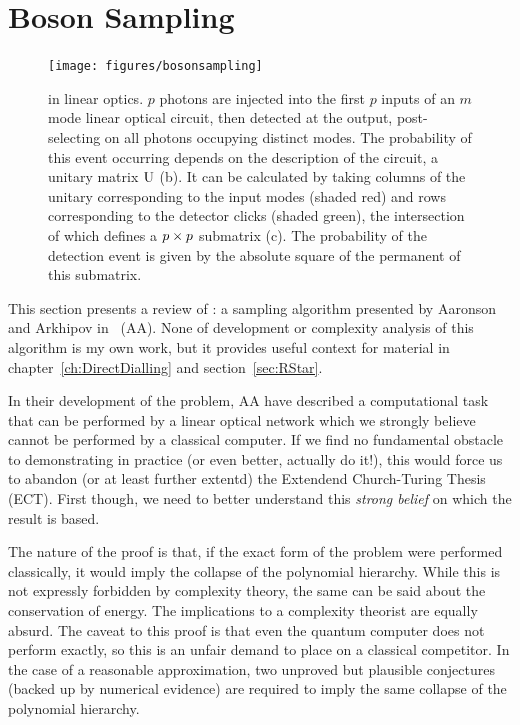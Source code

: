 \section{Boson Sampling}
\label{sec:BosonSampling}
\begin{figure}
  \texttt{[image: figures/bosonsampling]}
  \caption[BosonSampling in linear optics]
  {\bosonsampling{} in linear optics. \(p\) photons are injected into the first
  \(p\) inputs of an \(m\) mode linear optical circuit, then detected at the
  output, post-selecting on all photons occupying distinct modes. The
  probability of this event occurring depends on the description of the circuit,
  a unitary matrix \(\mathrm{U}\) (b). It can be calculated by taking columns of
  the unitary corresponding to the input modes (shaded red) and rows
  corresponding to the detector clicks (shaded green), the intersection of which
  defines a \(p \times p\) submatrix (c). The probability of the detection event is
  given by the absolute square of the permanent of this submatrix.}
  \label{fig:BosonSampling}
\end{figure}
This section presents a review of \bosonsampling{}: a sampling algorithm
presented by Aaronson and Arkhipov in~\cite{bosonsampling} (AA). None of
development or complexity analysis of this algorithm is my own work, but it
provides useful context for material in chapter~\ref{ch:DirectDialling} and
section~\ref{sec:RStar}.

In their development of the \bosonsampling{} problem, AA have described a
computational task that can be performed by a linear optical network which we
strongly believe cannot be performed by a classical computer. If we find no
fundamental obstacle to demonstrating \bosonsampling{} in practice (or even
better, actually do it!), this would force us to abandon (or at least further
extentd) the Extendend Church-Turing Thesis (ECT). First though, we need to
better understand this \emph{strong belief} on which the result is based.

The nature of the proof is that, if
the exact form of the \bosonsampling{} problem were performed classically, it
would imply the collapse of the polynomial hierarchy. While this is not
expressly forbidden by complexity theory, the same can be said about the
conservation of energy. The implications to a complexity theorist are equally
absurd. The caveat to this proof is that even the quantum computer does not
perform \bosonsampling{} exactly, so this is an unfair demand to place on a
classical competitor. In the case of a reasonable approximation, two unproved
but plausible conjectures (backed up by numerical evidence) are required to
imply the same collapse of the polynomial hierarchy.

